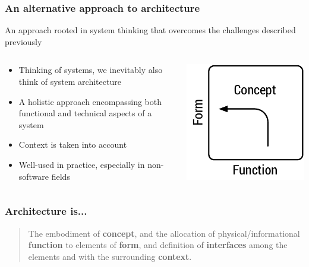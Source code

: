\begin{frame}
	\frametitle{An alternative approach to architecture}
	An approach rooted in system thinking that overcomes the challenges described previously
	\begin{columns}
		\begin{column}{6.8cm}
			\begin{itemize}
				\item Thinking of systems, we inevitably also think of system architecture
				\item A holistic approach encompassing both functional and technical aspects of a system
				\item Context is taken into account
				\item Well-used in practice, especially in non-software fields
			\end{itemize}
		\end{column}
		\begin{column}{3.2cm}
			\vfill
			\includegraphics[width=\textwidth]{ffc.pdf}
		\end{column}
	\end{columns}

\end{frame}


\begin{frame}[fragile]
  \frametitle{Architecture is...}
  		\begin{center}
			\begin{quote}
			The embodiment of \textbf{concept}, and the allocation of physical/informational \textbf{function} to elements of \textbf{form}, and definition of \textbf{interfaces} among the elements and with the surrounding \textbf{context}.
			\end{quote}
		\end{center}
	\cite{crawley2015systems} 
\end{frame}

